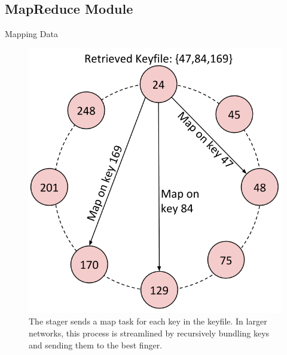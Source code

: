\documentclass[11pt]{beamer}
\begin{document}
\subsection{MapReduce Module}



 



\begin{frame}{Mapping Data}
\begin{figure}
    \includegraphics[width=0.48\linewidth]{CR_dataflow2}
    \caption{ \footnotesize{The stager sends a map task for each key in the keyfile. In larger networks, this process is streamlined by recursively bundling keys and sending them to the best finger.}}
	
\end{figure}
\end{frame}
\end{document}
